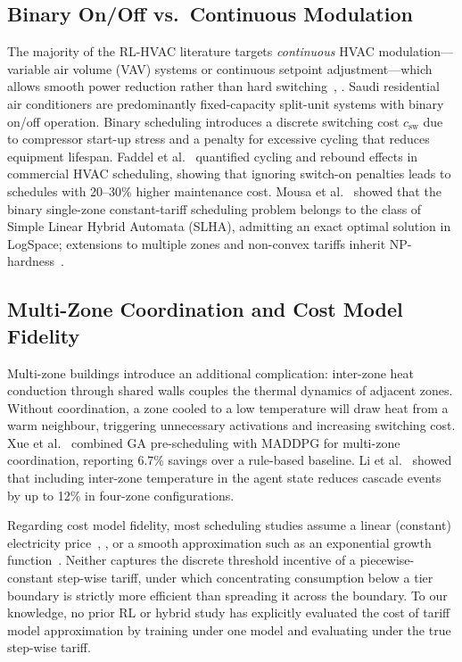 \documentclass[3p,number]{elsarticle}
\let\oldsubsection\subsection
\renewcommand{\subsection}{\FloatBarrier\oldsubsection}
\newcommand{\csw}{c_{\mathrm{sw}}}
\begin{document}
\subsection{Binary On/Off vs.\ Continuous Modulation}
 
The majority of the RL-HVAC literature targets \emph{continuous} HVAC modulation---variable air volume (VAV) systems or continuous setpoint adjustment---which allows smooth power reduction rather than hard switching~\cite{Wang2024DRL}, \cite{Guo2025}.
Saudi residential air conditioners are predominantly fixed-capacity split-unit systems with binary on/off operation.
Binary scheduling introduces a discrete switching cost $\csw$ due to compressor start-up stress and a penalty for excessive cycling that reduces equipment lifespan.
Faddel et al.~\cite{Faddel2023} quantified cycling and rebound effects in commercial HVAC scheduling, showing that ignoring switch-on penalties leads to schedules with 20--30\% higher maintenance cost.
Mousa et al.~\cite{Mousa2016} showed that the binary single-zone constant-tariff scheduling problem belongs to the class of Simple Linear Hybrid Automata (SLHA), admitting an exact optimal solution in LogSpace; extensions to multiple zones and non-convex tariffs inherit NP-hardness~\cite{Mousa2017}.
 
\subsection{Multi-Zone Coordination and Cost Model Fidelity}
 
\begin{sloppypar}
Multi-zone buildings introduce an additional complication: inter-zone heat conduction through shared walls couples the thermal dynamics of adjacent zones.
Without coordination, a zone cooled to a low temperature will draw heat from a warm neighbour, triggering unnecessary activations and increasing switching cost.
Xue et al.~\cite{Xue2025} combined GA pre-scheduling with MADDPG for multi-zone coordination, reporting 6.7\% savings over a rule-based baseline.
Li et al.~\cite{Li2024MZ} showed that including inter-zone temperature in the agent state reduces cascade events by up to 12\% in four-zone configurations.
\end{sloppypar}
 
Regarding cost model fidelity, most scheduling studies assume a linear (constant) electricity price~\cite{ElMakroum2023}, \cite{Gonçalves2022}, or a smooth approximation such as an exponential growth function~\cite{Risbeck2017}.
Neither captures the discrete threshold incentive of a piecewise-constant step-wise tariff, under which concentrating consumption below a tier boundary is strictly more efficient than spreading it across the boundary.
To our knowledge, no prior RL or hybrid study has explicitly evaluated the cost of tariff model approximation by training under one model and evaluating under the true step-wise tariff.
 
\end{document}
